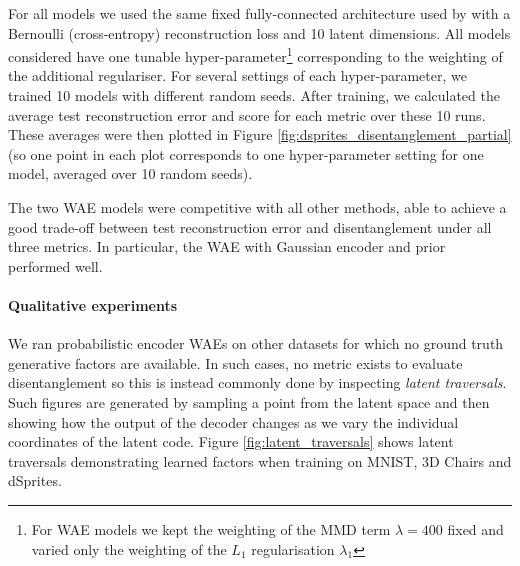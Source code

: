 For all models we used the same fixed fully-connected architecture used by \cite{HM+17} with a Bernoulli (cross-entropy) reconstruction loss and 10 latent dimensions.
All models considered have one tunable hyper-parameter\footnote{For WAE models we kept the weighting of the MMD term $\lambda=400$ fixed and varied only the weighting of the $L_1$ regularisation $\lambda_1$} corresponding to the weighting of the additional regulariser. For several settings of each hyper-parameter, we trained 10 models with different random seeds.
After training, we calculated the average test reconstruction error and score for each metric over these 10 runs. These averages were then plotted in Figure \ref{fig:dsprites_disentanglement_partial}  (so one point in each plot corresponds to one hyper-parameter setting for one model, averaged over 10 random seeds).

The two WAE models were competitive with all other methods, able to achieve a good trade-off between test reconstruction error and disentanglement under all three metrics. In particular, the WAE with Gaussian encoder and prior performed well.

\vspace{-0.2cm}

\paragraph{Qualitative experiments}

We ran probabilistic encoder WAEs on other datasets for which no ground truth generative factors are available. 
In such cases, no metric exists to evaluate disentanglement so this is instead commonly done by inspecting \emph{latent traversals}. Such figures are generated by sampling a point from the latent space and then showing how the output of the decoder changes as we vary the individual coordinates of the latent code. Figure \ref{fig:latent_traversals} shows latent traversals demonstrating learned factors when training on MNIST, 3D Chairs and dSprites.

